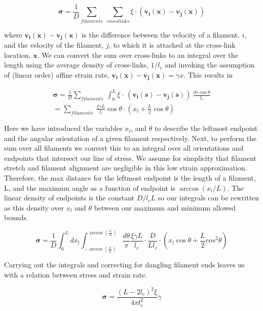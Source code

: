 \documentclass[pre,preprint]{revtex4-1}
\begin{document}
\begin{equation}
\mathbf{\sigma} = \frac{1}{D}\sum_{filaments}\: \sum_{crosslinks}\xi \cdot (\mathbf{v_i(x)}-\mathbf{v_j(x)})
\end{equation}

where $\mathbf{v_i(x)}-\mathbf{v_j(x)}$ is the difference between the velocity of a filament, $i$, and the velocity of the filament, $j$, to which it is attached at the cross-link location, $\mathbf{x}$. We can convert the sum over cross-links to an integral over the length using the average density of cross-links, $1/l_c$ and invoking the assumption of (linear order) affine strain rate, $\mathbf{v_i(x)}-\mathbf{v_j(x)}=\dot \gamma x$. This results in

\begin{multline}
\mathbf{\sigma} =  \frac{1}{D}\sum_{filaments}\:  \int_0^L \xi \cdot  \: (\mathbf{v_i(s)}-\mathbf{v_j(s)}) \:\frac{ds \cos \theta }{l_c} \\
 = \sum_{filaments}\:  \frac{\xi \dot \gamma L}{l_c} \cos \theta \cdot (x_l + \frac{L}{2} \cos \theta)
\end{multline}

Here we have introduced the variables $x_l$, and $\theta$ to describe the leftmost endpoint and the angular orientation of a given filament respectively.  Next, to perform the sum over all filaments we convert this to an integral over all orientations and endpoints that intersect our line of stress. We assume for simplicity that filament stretch and filament alignment are negligible in this low strain approximation.  Therefore, the max distance for the leftmost endpoint is the length of a filament, L, and the maximum angle as a function of endpoint is $\arccos(x_l/L)$.  The linear density of endpoints is the constant $D/l_cL$ so our integrals can be rewritten as this density over $x_l$ and $\theta$ between our maximum and minimum allowed bounds.

\begin{equation}
\mathbf{\sigma} =  \frac{1}{D} \int_0^L dx_l \int_{-\arccos (\frac{x_l}{L})}^{\arccos (\frac{x_l}{L})}\frac{d\theta}{\pi} \frac{\xi \dot \gamma L}{l_c} \cdot \frac{D}{Ll_c}\cdot (x_l \cos \theta + \frac{L}{2} cos^2\theta)
\end{equation}

Carrying out the integrals and correcting for dangling filament ends leaves us with a relation between stress and strain rate.

\begin{equation}
\mathbf{\sigma} = \frac{(L-2l_c)^2 \xi}{4\pi l_c^2} \dot \gamma 
\end{equation}
\end{document}
